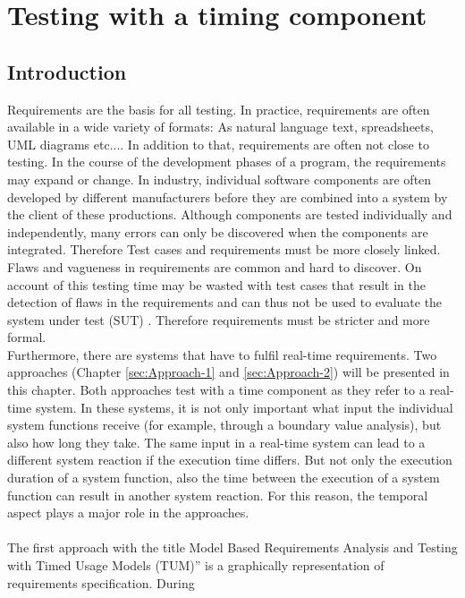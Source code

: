 \chapter{Testing with a timing component}\label{sec:topic_4}

\section{Introduction}

Requirements are the basis for all testing. In practice, requirements
are often available in a wide variety of formats: As natural language
text, spreadsheets, UML diagrams etc.... In addition to that, requirements
are often not close to testing. In the course of the development phases
of a program, the requirements may expand or change. In industry,
individual software components are often developed by different manufacturers
before they are combined into a system by the client of these productions.
Although components are tested individually and independently, many
errors can only be discovered when the components are integrated.
Therefore Test cases and requirements must be more closely linked.
Flaws and vagueness in requirements are common and hard to discover.
\textquotedbl On account of this testing time may be wasted with test
cases that result in the detection of flaws in the requirements and
can thus not be used to evaluate the system under test (SUT)\textquotedbl{}
\cite{Siegl2010}. Therefore requirements must be stricter and more
formal.\\
 Furthermore, there are systems that have to fulfil real-time requirements.
Two approaches (Chapter \ref{sec:Approach-1} and \ref{sec:Approach-2})
will be presented in this chapter. Both approaches test with a time
component as they refer to a real-time system. In these systems, it
is not only important what input the individual system functions receive
(for example, through a boundary value analysis), but also how long
they take. The same input in a real-time system can lead to a different
system reaction if the execution time differs. But not only the execution
duration of a system function, also the time between the execution
of a system function can result in another system reaction. For this
reason, the temporal aspect plays a major role in the approaches.\\
 \\
The first approach with the title \textquotedbl Model Based Requirements
Analysis and Testing with Timed Usage Models (TUM)'' is a graphically
representation of requirements specification. \textquotedbl During
